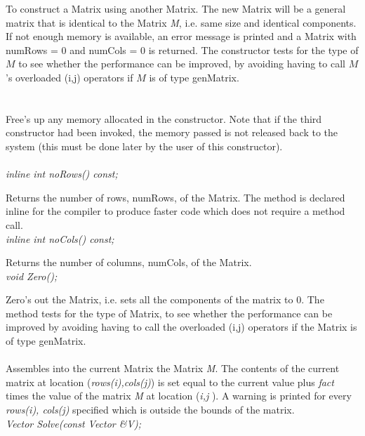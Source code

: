 To construct a Matrix using another Matrix. The new Matrix will be a
general matrix that is identical to the Matrix {\em M}, i.e. same size
and identical components. If not enough memory is available, an error
message is printed and a Matrix with numRows = $0$ and numCols = $0$
is returned. The constructor tests for the type of $M$ to see whether
the performance can be improved, by avoiding having to call $M$'s
overloaded (i,j) operators if $M$ is of type genMatrix. \\ 

 \\
 \\ 
Free's up any memory allocated in the constructor. Note that if the
third constructor had been invoked, the memory passed is not released
back to the system (this must be done later by the user of this
constructor). \\

  \\
{\em  inline int noRows() const;} 

Returns the number of rows, numRows, of the Matrix. The method is
declared inline for the compiler to produce faster code which does not
require a method call. \\

{\em  inline int noCols() const;} 

Returns the number of columns, numCols, of the Matrix. \\

{\em  void Zero();} 

Zero's out the Matrix, i.e. sets all the components of the matrix to
$0$. The method tests for the type of Matrix, to see whether the
performance can be improved by avoiding having to call the overloaded
(i,j) operators if the Matrix is of type genMatrix. \\ 

 \\
Assembles into the current Matrix the Matrix {\em M}. The contents of the
current matrix at location ({\em rows(i),cols(j)}) is set equal to the
current value plus {\em fact} times the value of the matrix {\em M}
at location ({\em i,j }). A warning is printed for every {\em rows(i),
cols(j)} specified which is outside the bounds of the matrix. \\

{\em  Vector Solve(const Vector \&V);} 

